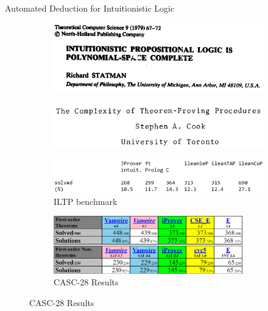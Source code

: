 \documentclass{cubeamer}
\begin{document}
	\begin{frame}{Automated Deduction for Intuitionistic Logic}
		\begin{figure}
			\begin{subfigure}{0.49\textwidth}
				\centering
				\includegraphics[width=\textwidth]{statman.png}
			\end{subfigure}
			\begin{subfigure}{0.49\textwidth}
				\centering
				\includegraphics[width=\textwidth]{cook.png}
			\end{subfigure}
		\begin{subfigure}[b]{0.49\textwidth}
			\centering
				\includegraphics[width=\textwidth]{iltp.png}
			\caption{ILTP benchmark}
		\end{subfigure}
		\begin{subfigure}[b]{0.49\textwidth}
			\includegraphics[width=0.9\textwidth]{CASC.png}
			\caption{CASC-28 Results}
		\end{subfigure}
		\end{figure}
	\end{frame}
	
\end{document}
